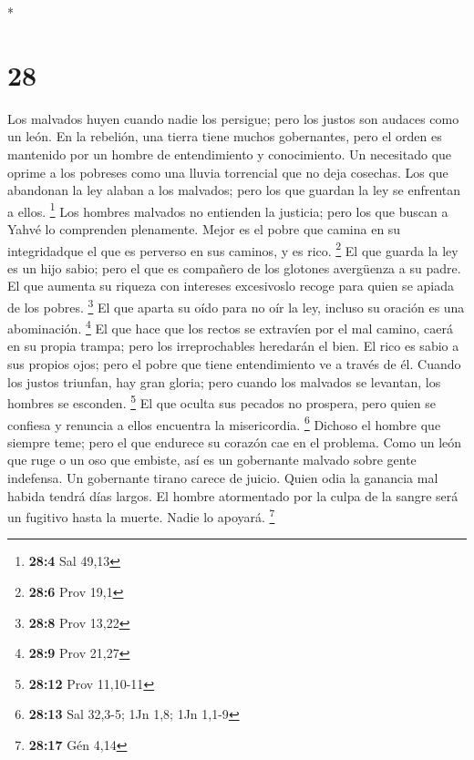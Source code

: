 \begin{paracol}{2}
\begin{otherlanguage}{english}
\end{otherlanguage}

\switchcolumn[0]*

\hypertarget{section-54}{%
\section{28}\label{section-54}}

 Los malvados huyen cuando nadie los persigue; pero los
justos son audaces como un león.  En la rebelión, una
tierra tiene muchos gobernantes, pero el orden es mantenido por un
hombre de entendimiento y conocimiento.  Un necesitado que
oprime a los pobreses como una lluvia torrencial que no deja cosechas.
 Los que abandonan la ley alaban a los malvados; pero los
que guardan la ley se enfrentan a ellos. \footnote{\textbf{28:4} Sal
  49,13}  Los hombres malvados no entienden la justicia;
pero los que buscan a Yahvé lo comprenden plenamente. 
Mejor es el pobre que camina en su integridadque el que es perverso en
sus caminos, y es rico. \footnote{\textbf{28:6} Prov 19,1}
 El que guarda la ley es un hijo sabio; pero el que es
compañero de los glotones avergüenza a su padre.  El que
aumenta su riqueza con intereses excesivoslo recoge para quien se apiada
de los pobres. \footnote{\textbf{28:8} Prov 13,22}  El que
aparta su oído para no oír la ley, incluso su oración es una
abominación. \footnote{\textbf{28:9} Prov 21,27}  El que
hace que los rectos se extravíen por el mal camino, caerá en su propia
trampa; pero los irreprochables heredarán el bien.  El
rico es sabio a sus propios ojos; pero el pobre que tiene entendimiento
ve a través de él.  Cuando los justos triunfan, hay gran
gloria; pero cuando los malvados se levantan, los hombres se esconden.
\footnote{\textbf{28:12} Prov 11,10-11}  El que oculta
sus pecados no prospera, pero quien se confiesa y renuncia a ellos
encuentra la misericordia. \footnote{\textbf{28:13} Sal 32,3-5; 1Jn 1,8;
  1Jn 1,1-9}  Dichoso el hombre que siempre teme; pero el
que endurece su corazón cae en el problema.  Como un león
que ruge o un oso que embiste, así es un gobernante malvado sobre gente
indefensa.  Un gobernante tirano carece de juicio. Quien
odia la ganancia mal habida tendrá días largos.  El
hombre atormentado por la culpa de la sangre será un fugitivo hasta la
muerte. Nadie lo apoyará. \footnote{\textbf{28:17} Gén 4,14}

\end{paracol}
